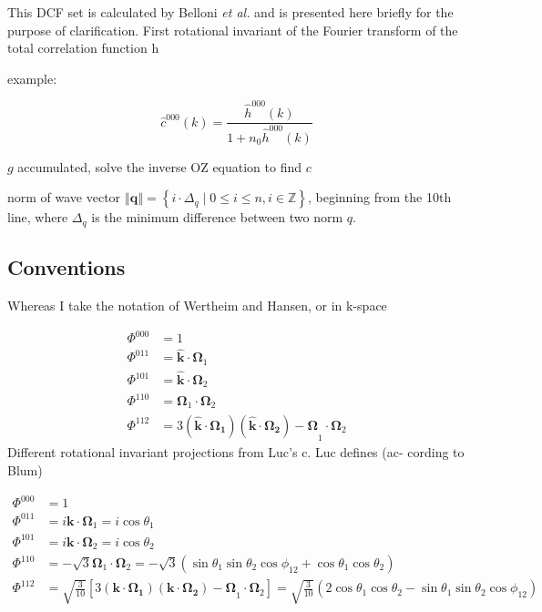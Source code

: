 This DCF set is calculated by Belloni \textit{et al.} \citep{Luc_2012}
and is presented here briefly for the purpose of clarification. First rotational
invariant of the Fourier transform of the total correlation function
h

example:

\[
\hat{c}^{000}(k)=\frac{\hat{h}^{000}(k)}{1+n_{0}\hat{h}^{000}(k)}
\]


$g$ accumulated, solve the inverse OZ equation to find $c$

norm of wave vector $\left\Vert \mathbf{q}\right\Vert =\left\{ i\cdot\Delta_{q}\mid0\leq i\leq n,i\in\mathbb{Z}\right\} $,
beginning from the 10th line, where $\Delta_{q}$ is the minimum difference
between two norm $q$. 


\subsection{Conventions}

Whereas I take the notation of Wertheim and Hansen, or in k-space

\begin{align}
\Phi^{000} & =1\nonumber \\
\Phi^{011} & =\hat{\mathbf{k}}\cdot\mathbf{\Omega}_{1}\nonumber \\
\Phi^{101} & =\hat{\mathbf{k}}\cdot\mathbf{\Omega}_{2}\nonumber \\
\Phi^{110} & =\mathbf{\Omega}_{1}\cdot\mathbf{\Omega}_{2}\\
\Phi^{112} & =3\mathbf{(\hat{\mathbf{k}}\cdot\mathbf{\Omega}_{1})(\hat{\mathbf{k}}\cdot\mathbf{\Omega}_{2})-\Omega}_{1}\cdot\mathbf{\Omega}_{2}\nonumber 
\end{align}
Different rotational invariant projections from Luc’s c. Luc defines
(ac- cording to Blum)

\begin{align}
\Phi^{000} & =1\nonumber \\
\Phi^{011} & =i\mathbf{k}\cdot\mathbf{\Omega}_{1}=i\cos\theta_{1}\nonumber \\
\Phi^{101} & =i\mathbf{k}\cdot\mathbf{\Omega}_{2}=i\cos\theta_{2}\nonumber \\
\Phi^{110} & =-\sqrt{3}\mathbf{\Omega}_{1}\cdot\mathbf{\Omega}_{2}=-\sqrt{3}(\sin\theta_{1}\sin\theta_{2}\cos\phi_{12}+\cos\theta_{1}\cos\theta_{2})\\
\Phi^{112} & =\sqrt{\frac{3}{10}}\left[3\mathbf{(\mathbf{k}\cdot\mathbf{\Omega}_{1})(\mathbf{k}\cdot\mathbf{\Omega}_{2})-\Omega}_{1}\cdot\mathbf{\Omega}_{2}\right]=\sqrt{\frac{3}{10}}\left(2\cos\theta_{1}\cos\theta_{2}-\sin\theta_{1}\sin\theta_{2}\cos\phi_{12}\right)\nonumber 
\end{align}



